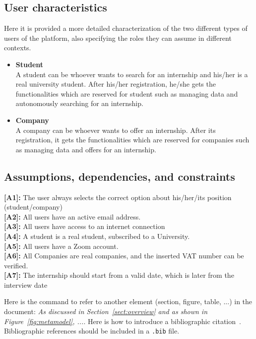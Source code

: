\subsection{User characteristics}
Here it is provided a more detailed characterization of the two different types of users of the platform, also specifying the roles they can assume in different contexts. 
\begin{itemize}
    \item \textbf{Student}\\
    A student can be whoever wants to search for an internship and his/her is a real university student. After his/her registration, he/she gets the functionalities which are reserved for student such as managing data and autonomously searching for an internship.
    \item \textbf{Company}\\
    A company can be whoever wants to offer an internship. After its registration, it gets the functionalities which are reserved for companies such as managing data and offers for an internship.
\end{itemize}

\subsection{Assumptions, dependencies, and constraints}
\textbf{[A1]:} The user always selects the correct option about his/her/its position (student/company)\\
\textbf{[A2]:} All users have an active email address.\\ 
\textbf{[A3]:} All users have access to an internet connection\\
\textbf{[A4]:} A student is a real student, subscribed to a University.\\
\textbf{[A5]:} All users have a Zoom account.\\
\textbf{[A6]:} All Companies are real companies, and the inserted VAT number can be verified.\\
\textbf{[A7]:} The internship should start from a valid date, which is later from the interview date




Here is the command to refer to another element (section, figure, table, ...) in the document: \emph{As discussed in Section~\ref{sect:overview} and as shown in Figure~\ref{fig:metamodel}, ...}. Here is how to introduce a bibliographic citation~\cite{DAM}. Bibliographic references should be included in a \texttt{.bib} file.